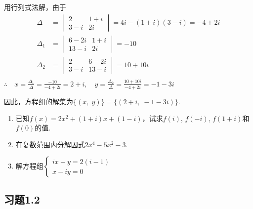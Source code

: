 \begin{solution}
   用行列式法解，由于
\[\begin{split}
    \Delta&=\begin{vmatrix}
    2& 1+i\\
    3-i& 2i
\end{vmatrix}=4i-(1+i)(3-i)=-4+2i\\
\Delta_{1}&=\begin{vmatrix}
   6- 2i& 1+i\\
    13-i& 2i
\end{vmatrix}=-10\\
\Delta_{2}&=\begin{vmatrix}
    2& 6-2i\\
     3-i& 13-i
 \end{vmatrix}=10+10i\\
\end{split}\]
$\therefore\quad x= \frac {\Delta_{1}}{\Delta} = \frac {- 10}{- 4+ 2i}= 2+ i,\quad 
y=\frac{\Delta_{2}}{\Delta}=\frac{10+10i}{-4+2i}=-1-3i$

因此，方程组的解集为$\{(x,\; y)\}=\{(2+i,\;  -1-3i)\}$.
\end{solution}

\begin{ex}
\begin{enumerate}
    \item 已知$f(x)=2x^2+(1+i)x+(1-i)$，试求$f(i)$, $f(-i)$, $f(1+i)$和$f(0)$的值.
    \item 在复数范围内分解因式$2x^4-5x^2-3$.
    \item 解方程组$\begin{cases}
        ix-y=2(i-1)\\
        x-iy=0
    \end{cases}$
\end{enumerate}
\end{ex}

\subsection*{习题1.2}

